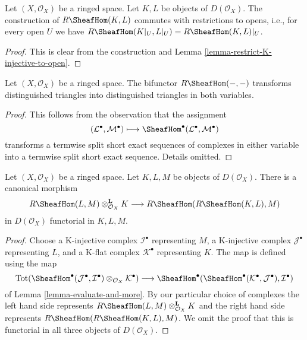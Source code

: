 \begin{lemma}
\label{lemma-restriction-RHom-to-U}
Let $(X, \mathcal{O}_X)$ be a ringed space. Let $K, L$ be objects
of $D(\mathcal{O}_X)$. The construction of $R\SheafHom(K, L)$
commutes with restrictions to opens, i.e.,
for every open $U$ we have
$R\SheafHom(K|_U, L|_U) = R\SheafHom(K, L)|_U$.
\end{lemma}

\begin{proof}
This is clear from the construction and
Lemma \ref{lemma-restrict-K-injective-to-open}.
\end{proof}

\begin{lemma}
\label{lemma-RHom-triangulated}
Let $(X, \mathcal{O}_X)$ be a ringed space. The bifunctor $R\SheafHom(- , -)$
transforms distinguished triangles into distinguished triangles in both
variables.
\end{lemma}

\begin{proof}
This follows from the observation that the assignment
$$
(\mathcal{L}^\bullet, \mathcal{M}^\bullet) \longmapsto
\SheafHom^\bullet(\mathcal{L}^\bullet, \mathcal{M}^\bullet)
$$
transforms a termwise split short exact sequences of complexes in either
variable into a termwise split short exact sequence. Details omitted.
\end{proof}

\begin{lemma}
\label{lemma-internal-hom-evaluate}
Let $(X, \mathcal{O}_X)$ be a ringed space. Let $K, L, M$ be objects of
$D(\mathcal{O}_X)$. There is a canonical morphism
$$
R\SheafHom(L, M) \otimes_{\mathcal{O}_X}^\mathbf{L} K
\longrightarrow
R\SheafHom(R\SheafHom(K, L), M)
$$
in $D(\mathcal{O}_X)$ functorial in $K, L, M$.
\end{lemma}

\begin{proof}
Choose
a K-injective complex $\mathcal{I}^\bullet$ representing $M$,
a K-injective complex $\mathcal{J}^\bullet$ representing $L$, and
a K-flat complex $\mathcal{K}^\bullet$ representing $K$.
The map is defined using the map
$$
\text{Tot}(\SheafHom^\bullet(\mathcal{J}^\bullet,
\mathcal{I}^\bullet) \otimes_{\mathcal{O}_X} \mathcal{K}^\bullet)
\longrightarrow
\SheafHom^\bullet(\SheafHom^\bullet(\mathcal{K}^\bullet,
\mathcal{J}^\bullet), \mathcal{I}^\bullet)
$$
of Lemma \ref{lemma-evaluate-and-more}. By our particular
choice of complexes the left hand side represents
$R\SheafHom(L, M) \otimes_{\mathcal{O}_X}^\mathbf{L} K$
and the right hand side represents
$R\SheafHom(R\SheafHom(K, L), M)$. We omit the proof that
this is functorial in all three objects of $D(\mathcal{O}_X)$.
\end{proof}

